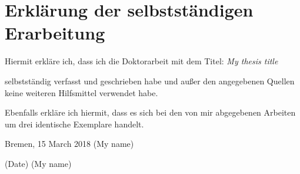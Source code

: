 \cleardoublepage
\chapter*{Erkl\"arung der selbstst\"andigen Erarbeitung}



Hiermit erkl\"{a}re ich, dass ich die Doktorarbeit mit dem Titel:
\textit{My thesis title}

selbstst\"{a}ndig verfasst und geschrieben habe und außer den angegebenen Quellen keine weiteren Hilfsmittel verwendet habe.

Ebenfalls erkl\"{a}re ich hiermit, dass es sich bei den von mir abgegebenen Arbeiten um drei identische Exemplare handelt.

\begin{flushleft}
Bremen, 15 March 2018 \underline{\hspace{6.3cm}}
\hspace*{5cm}(My name)
\end{flushleft}

\begin{flushleft}
\underline{\hspace{6.3cm}} \hspace{2cm} \underline{\hspace{6.3cm}}
\hspace*{3cm}(Date) \hspace{5cm} \hspace*{5cm}(My name)
\end{flushleft}